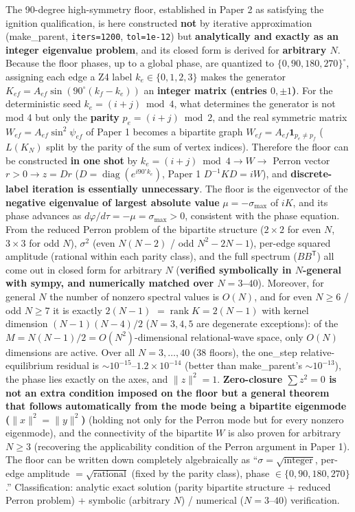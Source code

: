 \documentclass[
  a4paper,
]{ltjsarticle}
\begin{document}
The 90-degree high-symmetry floor, established in Paper 2 as satisfying
the ignition qualification, is here constructed \textbf{not} by
iterative approximation (make\_parent, \texttt{iters=1200},
\texttt{tol=1e-12}) but \textbf{analytically and exactly as an integer
eigenvalue problem}, and its closed form is derived for
\textbf{arbitrary \(N\)}. Because the floor phases, up to a global
phase, are quantized to \(\{0,90,180,270\}^\circ\), assigning each edge
a Z4 label \(k_e\in\{0,1,2,3\}\) makes the generator
\(K_{ef}=A_{ef}\sin(90^\circ(k_f-k_e))\) an \textbf{integer matrix
(entries \(0,\pm1\))}. For the deterministic seed \(k_e=(i+j)\bmod4\),
what determines the generator is not mod 4 but only the \textbf{parity}
\(p_e=(i+j)\bmod2\), and the real symmetric matrix
\(W_{ef}=A_{ef}\sin^2\psi_{ef}\) of Paper 1 becomes a bipartite graph
\(W_{ef}=A_{ef}\mathbf 1_{p_e\neq p_f}\) (\(L(K_N)\) split by the parity
of the sum of vertex indices). Therefore the floor can be constructed
\textbf{in one shot} by \(k_e=(i+j)\bmod4\to W\to\) Perron vector
\(r>0\to z=Dr\) (\(D=\operatorname{diag}(e^{i90^\circ k_e})\), Paper 1
\(D^{-1}KD=iW\)), and \textbf{discrete-label iteration is essentially
unnecessary}. The floor is the eigenvector of the \textbf{negative
eigenvalue of largest absolute value} \(\mu=-\sigma_{\max}\) of \(iK\),
and its phase advances as \(d\varphi/d\tau=-\mu=\sigma_{\max}>0\),
consistent with the phase equation. From the reduced Perron problem of
the bipartite structure (\(2\times2\) for even \(N\), \(3\times3\) for
odd \(N\)), \(\sigma^2\) (even \(N(N-2)\) / odd \(N^2-2N-1\)), per-edge
squared amplitude (rational within each parity class), and the full
spectrum (\(BB^{\mathsf T}\)) all come out in closed form for arbitrary
\(N\) (\textbf{verified symbolically in \(N\)-general with sympy, and
numerically matched over \(N=3\)--\(40\)}). Moreover, for general \(N\)
the number of nonzero spectral values is \(O(N)\), and for even
\(N\ge6\) / odd \(N\ge7\) it is exactly \(2(N-1)\)
\(=\operatorname{rank}K=2(N-1)\) with kernel dimension \((N-1)(N-4)/2\)
(\(N=3,4,5\) are degenerate exceptions): of the
\(M=N(N-1)/2=O(N^2)\)-dimensional relational-wave space, only \(O(N)\)
dimensions are active. Over all \(N=3,\ldots,40\) (38 floors), the
one\_step relative-equilibrium residual is
\(\sim10^{-15}\)--\(1.2\times10^{-14}\) (better than make\_parent's
\(\sim10^{-13}\)), the phase lies exactly on the axes, and
\(\|z\|^2=1\). \textbf{Zero-closure \(\sum z^2=0\) is not an extra
condition imposed on the floor but a general theorem that follows
automatically from the mode being a bipartite eigenmode
(\(\|x\|^2=\|y\|^2\))} (holding not only for the Perron mode but for
every nonzero eigenmode), and the connectivity of the bipartite \(W\) is
also proven for arbitrary \(N\ge3\) (recovering the applicability
condition of the Perron argument in Paper 1). The floor can be written
down completely algebraically as ``\(\sigma=\sqrt{\text{integer}}\),
per-edge amplitude \(=\sqrt{\text{rational}}\) (fixed by the parity
class), phase \(\in\{0,90,180,270\}\).'' Classification: analytic exact
solution (parity bipartite structure + reduced Perron problem) +
symbolic (arbitrary \(N\)) / numerical (\(N=3\)--\(40\)) verification.
\end{document}
